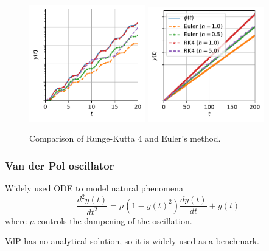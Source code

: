\documentclass[t]{beamer}
\begin{document}
\begin{frame}
    \begin{figure}[h]
	\vspace{.1\textheight}
	\centering
	\includegraphics[width=0.45\textwidth]{../images/ode_solver_comparison_zoom.pdf}
	\includegraphics[width=0.45\textwidth]{../images/ode_solver_comparison.pdf}
	\caption{Comparison of Runge-Kutta 4 and Euler's method.}
	\label{fig:ode_comparison}
    \end{figure}
\end{frame}

\begin{frame}
    \frametitle{Van der Pol oscillator}
    Widely used ODE to model natural phenomena \[
    \frac{d^2 y(t)}{dt^2} = \mu\left( 1-y(t)^2 \right) \frac{d y(t)}{dt} + y(t)
    \] where $\mu$ controls the dampening of the oscillation.

    VdP has no analytical solution, so it is widely used as a benchmark.
\end{frame}
\end{document}
